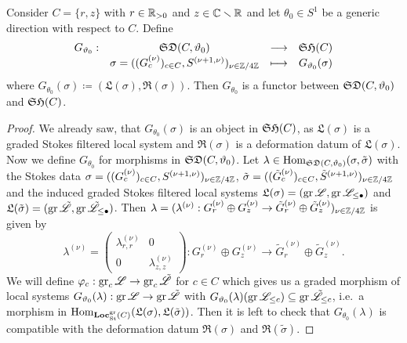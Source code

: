 \begin{prop}\label{G-Funktor}
    Consider $C=\{r,z\}$ with $r \in \mathbb{R}_{>0}$ and $z \in \mathbb{C}\smallsetminus \mathbb{R}$ and let $\theta_0 \in S^1$ be a generic direction with respect to $C$. Define 
    \[
    \begin{matrix}
        G_{\vartheta_0}: & \mathfrak{SD}(C,\vartheta_0) &\longrightarrow &\mathfrak{SH}(C) \\
        & \sigma = ((G_c^{(\nu)})_{c \in C}, S^{(\nu+1,\nu)})_{\nu \in \mathbb{Z}/4\mathbb{Z}} & \longmapsto & G_{\vartheta_0}(\sigma)
    \end{matrix}
    \]
    where $G_{\theta_0}(\sigma) \coloneqq (\mathfrak{L}(\sigma), \mathfrak{R}(\sigma))$. Then $G_{\theta_0}$ is a functor between $\mathfrak{SD}(C,\vartheta_0)$ and $\mathfrak{SH}(C)$.
\end{prop}
\begin{proof}
    We already saw, that $G_{\theta_0}(\sigma)$ is an object in $\mathfrak{SH}(C)$, as $\mathfrak{L}(\sigma)$ is a graded Stokes filtered local system and $\mathfrak{R}(\sigma)$ is a deformation datum of $\mathfrak{L}(\sigma)$. \\
    Now we define $G_{\theta_0}$ for morphisms in $\mathfrak{SD}(C,\vartheta_0)$. Let $\lambda \in \operatorname{Hom}_{\mathfrak{SD}(C,\vartheta_0)}(\sigma, \tilde{\sigma})$ with the Stokes data $\sigma = ((G_c^{(\nu)})_{c \in C}, S^{(\nu+1,\nu)})_{\nu \in \mathbb{Z}/4\mathbb{Z}}$, $\tilde{\sigma} = ((\tilde{G}_c^{(\nu)})_{c \in C}, \tilde{S}^{(\nu+1,\nu)})_{\nu \in \mathbb{Z}/4\mathbb{Z}}$ and the induced graded Stokes filtered local systems $\mathfrak{L}(\sigma) = (\operatorname{gr}\mathscr{L}, \operatorname{gr}\mathscr{L}_{\leq \bullet})$ and $\mathfrak{L}(\tilde{\sigma})=(\operatorname{gr}\tilde{\mathscr{L}}, \operatorname{gr}\tilde{\mathscr{L}}_{\leq \bullet})$. Then $\lambda = (\lambda^{(\nu)}:G_r^{(\nu)} \oplus G_z^{(\nu)} \to \tilde{G}_r^{(\nu)} \oplus \tilde{G}_z^{(\nu)})_{\nu \in \mathbb{Z}/4\mathbb{Z}}$ is given by
    \[
    \lambda^{(\nu)} = 
    \begin{pmatrix}
        \lambda_{r,r}^{(\nu)} & 0 \\
        0 & \lambda_{z,z}^{(\nu)} \end{pmatrix}
        :G_{r}^{(\nu)}\oplus G_z^{(\nu)} \longrightarrow \tilde{G}_{r}^{(\nu)} \oplus \tilde{G}_z^{(\nu)}.
    \]
    We will define $\varphi_c: \operatorname{gr}_c\mathscr{L} \to \operatorname{gr}_c\tilde{\mathscr{L}}$ for $c \in C$ which gives us a graded morphism of local systems $G_{\vartheta_0}(\lambda):\operatorname{gr}\mathscr{L} \to \operatorname{gr}\tilde{\mathscr{L}}$ with $G_{\vartheta_0}(\lambda)(\operatorname{gr}\mathscr{L}_{\leq c}) \subseteq \operatorname{gr}\tilde{\mathscr{L}}_{\leq c}$, i.e.\ a morphism in $\operatorname{Hom}_{\mathbf{Loc}_{\textrm{St}}^{\operatorname{gr}}(C)}(\mathfrak{L}(\sigma), \mathfrak{L}(\tilde{\sigma}))$. Then it is left to check that $G_{\theta_0}(\lambda)$ is compatible with the deformation datum $\mathfrak{R}(\sigma)$ and $\mathfrak{R}(\tilde{\sigma})$.


\end{proof}
